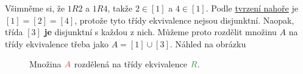 \begin{example}
 Všimněme si, že $1R2$ a $1R4$, takže $2 \in [1]$ a $4 \in [1]$. Podle
 \hyperref[claim:vlastnosti-trid-ekvivalence]{tvrzení nahoře} je $[1] = [2] =
 [4]$, protože tyto třídy ekvivalence nejsou disjunktní. Naopak, třída $[3]$
 \textbf{je} disjunktní s každou z nich. Můžeme proto rozdělit množinu $A$ na
 třídy ekvivalence třeba jako $A = [1] \cup [3]$. Náhled na obrázku
 \begin{figure}[H]
  \vspace{1em}
  \centering
  \caption{Množina $\clr{A}$ rozdělená na třídy ekvivalence $\clg{R}$.}
  \label{fig:rozdeleni-na-tridy}
 \end{figure}
\end{example}
